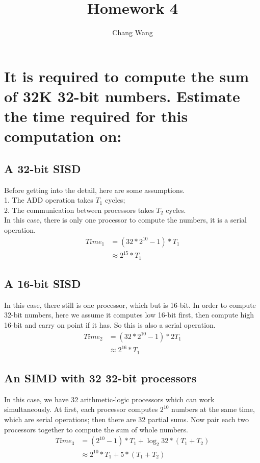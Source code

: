 \documentclass[12pt,a4paper]{report}
\title{Homework 4}
\author{Chang Wang}
\begin{document}
\maketitle

\section{It is required to compute the sum of 32K 32-bit numbers. Estimate the time required for this computation on:}
\subsection{A 32-bit SISD}
Before getting into the detail, here are some assumptions. \\[0.15cm]
1. The ADD operation takes $T_{1}$ cycles; \\[0.15cm]
2. The communication between processors takes $T_{2}$ cycles. \\[0.15cm]
In this case, there is only one processor to compute the numbers, it is a serial operation.
\begin{equation*}
\begin{split}
Time_{1}& = (32 * 2^{10} - 1) * T_{1} \\
		& \approx 2^{15} * T_{1}
\end{split}
\end{equation*}

\subsection{A 16-bit SISD}
In this case, there still is one processor, which but is 16-bit. In order to compute 32-bit numbers, here we assume it computes low 16-bit first, then compute high 16-bit and carry on point if it has. So this is also a serial operation.
\begin{equation*}
\begin{split}
Time_{2}& = (32 * 2^{10} - 1) * 2T_{1} \\
         & \approx 2^{16} * T_{1}
\end{split}
\end{equation*}

\subsection{An SIMD with 32 32-bit processors}
In this case, we have 32 arithmetic-logic processors which can work simultaneously. At first, each processor computes $2^{10}$ numbers at the same time, which are serial operations; then there are 32 partial sums. Now pair each two processors together to compute the sum of whole numbers.
\begin{equation*}
\begin{split}
Time_{3}& = (2^{10} - 1) * T_{1} + \log_{2} 32 * (T_{1} + T_{2}) \\
& \approx 2^{10} * T_{1} + 5 * (T_{1} + T_{2})
\end{split}
\end{equation*}
\end{document}
